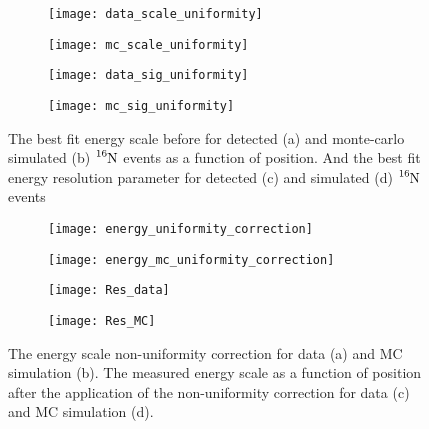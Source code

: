 \begin{figure}[htbp]
\centering
\begin{subfigure}{0.49\textwidth}
\centering
\texttt{[image: data\_scale\_uniformity]}
\caption[]{}
\end{subfigure}
\hfill
\begin{subfigure}{0.49\textwidth}
\centering
\texttt{[image: mc\_scale\_uniformity]}
\caption[]{}
\end{subfigure}

\begin{subfigure}{0.49\textwidth}
\centering
\texttt{[image: data\_sig\_uniformity]}
\caption[]{}
\end{subfigure}
\hfill
\begin{subfigure}{0.49\textwidth}
\centering
\texttt{[image: mc\_sig\_uniformity]}
\caption[]{}
\end{subfigure}
\caption[Position Depedence of Energy Scale and Resolution from $\ce{^{16}N}$]
{The best fit energy scale before for detected (a) and monte-carlo simulated (b)  $\ce{^{16}N}$
events as a function of position.
And the best fit energy resolution parameter for detected (c) and 
simulated (d) $\ce{^{16}N}$ events}
\label{fig:n16_uniformity}
\end{figure}

\begin{figure}[htbp]
\begin{subfigure}{0.49\textwidth}
\centering
\texttt{[image: energy\_uniformity\_correction]}
\caption[]{}
\end{subfigure}
\hfill
\begin{subfigure}{0.49\textwidth}
\centering
\texttt{[image: energy\_mc\_uniformity\_correction]}
\caption[]{}
\end{subfigure}

\begin{subfigure}{0.49\textwidth}
\centering
\texttt{[image: Res\_data]}
\caption[]{}
\end{subfigure}
\hfill
\begin{subfigure}{0.49\textwidth}
\centering
\texttt{[image: Res\_MC]}
\caption[]{}
\end{subfigure}
\caption[Energy Scale Uniformity Correction and Results]{The energy scale
non-uniformity correction for data (a) and MC simulation (b).
The measured energy scale as a function of position after the application
of the non-uniformity correction for data (c) and MC simulation (d).}
\label{fig:uniformity_corrections}
\end{figure}

